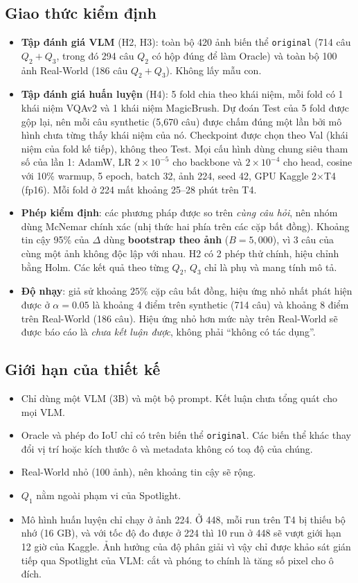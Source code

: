 \documentclass[12pt]{ai_conquer2026}
\begin{document}
\subsection{Giao thức kiểm định}
\begin{itemize}
    \item \textbf{Tập đánh giá VLM} (H2, H3): toàn bộ 420 ảnh biến thể \texttt{original} (714 câu $Q_2{+}Q_3$, trong đó 294 câu $Q_2$ có hộp đúng để làm Oracle) và toàn bộ 100 ảnh Real-World (186 câu $Q_2{+}Q_3$). Không lấy mẫu con.
    \item \textbf{Tập đánh giá huấn luyện} (H4): 5 fold chia theo khái niệm, mỗi fold có 1 khái niệm VQAv2 và 1 khái niệm MagicBrush. Dự đoán Test của 5 fold được gộp lại, nên mỗi câu synthetic (5{,}670 câu) được chấm đúng một lần bởi mô hình chưa từng thấy khái niệm của nó. Checkpoint được chọn theo Val (khái niệm của fold kế tiếp), không theo Test. Mọi cấu hình dùng chung siêu tham số của lần 1: AdamW, LR $2\times10^{-5}$ cho backbone và $2\times10^{-4}$ cho head, cosine với 10\% warmup, 5 epoch, batch 32, ảnh 224, seed 42, GPU Kaggle 2$\times$T4 (fp16). Mỗi fold ở 224 mất khoảng 25--28 phút trên T4.
    \item \textbf{Phép kiểm định}: các phương pháp được so trên \emph{cùng câu hỏi}, nên nhóm dùng McNemar chính xác (nhị thức hai phía trên các cặp bất đồng). Khoảng tin cậy 95\% của $\Delta$ dùng \textbf{bootstrap theo ảnh} ($B = 5{,}000$), vì 3 câu của cùng một ảnh không độc lập với nhau. H2 có 2 phép thử chính, hiệu chỉnh bằng Holm. Các kết quả theo từng $Q_2$, $Q_3$ chỉ là phụ và mang tính mô tả.
    \item \textbf{Độ nhạy}: giả sử khoảng $25\%$ cặp câu bất đồng, hiệu ứng nhỏ nhất phát hiện được ở $\alpha=0.05$ là khoảng 4 điểm trên synthetic (714 câu) và khoảng 8 điểm trên Real-World (186 câu). Hiệu ứng nhỏ hơn mức này trên Real-World sẽ được báo cáo là \emph{chưa kết luận được}, không phải ``không có tác dụng''.
\end{itemize}

\subsection{Giới hạn của thiết kế}
\begin{itemize}
    \item Chỉ dùng một VLM (3B) và một bộ prompt. Kết luận chưa tổng quát cho mọi VLM.
    \item Oracle và phép đo IoU chỉ có trên biến thể \texttt{original}. Các biến thể khác thay đổi vị trí hoặc kích thước ô và metadata không có toạ độ của chúng.
    \item Real-World nhỏ (100 ảnh), nên khoảng tin cậy sẽ rộng.
    \item $Q_1$ nằm ngoài phạm vi của Spotlight.
    \item Mô hình huấn luyện chỉ chạy ở ảnh 224. Ở 448, mỗi run trên T4 bị thiếu bộ nhớ (16 GB), và với tốc độ đo được ở 224 thì 10 run ở 448 sẽ vượt giới hạn 12 giờ của Kaggle. Ảnh hưởng của độ phân giải vì vậy chỉ được khảo sát gián tiếp qua Spotlight của VLM: cắt và phóng to chính là tăng số pixel cho ô đích.
\end{itemize}
\end{document}
